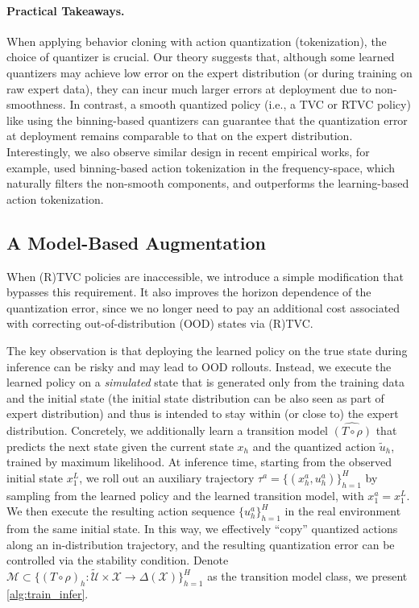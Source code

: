 \documentclass{article}
\let\oldparagraph\paragraph
\renewcommand{\paragraph}[1]{\oldparagraph{#1.}}
\begin{document}
\paragraph{Practical Takeaways}
When applying behavior cloning with action quantization (tokenization), the choice of quantizer is crucial. Our theory suggests that, although some learned quantizers may achieve low error on the expert distribution (or during training on raw expert data), they can incur much larger errors at deployment due to non-smoothness. In contrast, a smooth quantized policy (i.e., a TVC or RTVC policy) like using the binning-based quantizers can guarantee that the quantization error at deployment remains comparable to that on the expert distribution. Interestingly, we also observe similar design in recent empirical works, for example, \citet{pertsch2025fast} used binning-based action tokenization in the frequency-space, which naturally filters the non-smooth components, and outperforms the learning-based action tokenization.

\subsection{A Model-Based Augmentation}
When (R)TVC policies are inaccessible, we introduce a simple modification that bypasses this requirement. It also improves the horizon dependence of the quantization error, since we no longer need to pay an additional cost associated with correcting out-of-distribution (OOD) states via (R)TVC.

The key observation is that deploying the learned policy on the true state during inference can be risky and may lead to OOD rollouts. Instead, we execute the learned policy on a \emph{simulated} state that is generated only from the training data and the initial state (the initial state distribution can be also seen as part of expert distribution) and thus is intended to stay within (or close to) the expert distribution. Concretely, we additionally learn a transition model $\widehat{(T\circ \rho)}$ that predicts the next state given the current state $x_h$ and the quantized action $\tilde u_h$, trained by maximum likelihood. At inference time, starting from the observed initial state $x_1^L$, we roll out an auxiliary trajectory $\tau^a=\{(x_h^a, u^a_h)\}_{h=1}^H$ by sampling from the learned policy and the learned transition model, with $x_1^a= x_1^L$. We then execute the resulting action sequence $\{ u^a_h\}_{h=1}^H$ in the real environment from the same initial state. In this way, we effectively ``copy'' quantized actions along an in-distribution trajectory, and the resulting quantization error can be controlled via the stability condition. Denote $\mathcal M\subset \{(T\circ \rho)_h: \tilde{\mathcal U}\times \mathcal X \rightarrow \Delta(\mathcal X)\}_{h=1}^H$ as the transition model class, we present  \cref{alg:train_infer}. 
\end{document}
